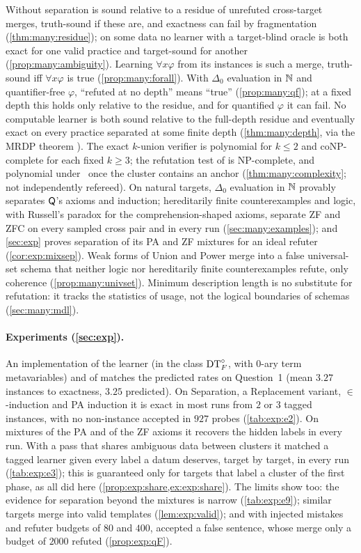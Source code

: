 Without separation \DTRC{} is sound relative to a residue of unrefuted cross-target merges, truth-sound if these are,
and exactness can fail by fragmentation (\cref{thm:many:residue}); on some data no learner with a target-blind oracle is
both exact for one valid practice and target-sound for another (\cref{prop:many:ambiguity}). Learning $\forall x\varphi$
from its instances is such a merge, truth-sound iff $\forall x\varphi$ is true (\cref{prop:many:forall}). With
$\Delta_0$ evaluation in $\mathbb{N}$ and quantifier-free $\varphi$, ``refuted at no depth'' means ``true''
(\cref{prop:many:qf}); at a fixed depth this holds only relative to the residue, and for quantified $\varphi$ it can
fail. No computable learner is both sound relative to the full-depth residue and eventually exact on every practice
separated at some finite depth (\cref{thm:many:depth}, via the MRDP theorem \citep{matiyasevich1993hilbert}). The exact
$k$-union verifier is polynomial for $k\le2$ and coNP-complete for each fixed $k\ge3$; the refutation test of \DTRC{} is
NP-complete, and polynomial under \Rich\ once the cluster contains an anchor (\cref{thm:many:complexity}; not
independently refereed). On natural targets, $\Delta_0$ evaluation in $\mathbb{N}$ provably separates $\mathsf{Q}$'s axioms and
induction; hereditarily finite counterexamples and logic, with Russell's paradox for the comprehension-shaped axioms,
separate ZF and ZFC on every sampled cross pair and in every run (\cref{sec:many:examples}); and \cref{sec:exp} proves
separation of its PA and ZF mixtures for an ideal refuter (\cref{cor:exp:mixsep}). Weak forms of Union and Power merge
into a false universal-set schema that neither logic nor hereditarily finite counterexamples refute, only coherence
(\cref{prop:many:univset}). Minimum
description length is no substitute for refutation: it tracks the statistics of usage, not the logical boundaries of
schemas (\cref{sec:many:mdl}).

\paragraph{Experiments (\cref{sec:exp}).}
An implementation of the learner (in the class $\mathrm{DT}^{\circ}_{F}$, with $0$-ary term metavariables) and of \DTRC{} matches the
predicted rates on Question~1 (mean $3.27$ instances to exactness, $3.25$ predicted). On Separation, a Replacement
variant, $\in$-induction and PA induction it is exact in most runs from $2$ or $3$ tagged instances, with no
non-instance accepted in $927$ probes (\cref{tab:exp:e2}). On mixtures of the PA and of the ZF axioms it recovers the
hidden labels in every run. With a pass that shares ambiguous data between clusters it matched a tagged learner given
every label a datum deserves, target by target, in every run (\cref{tab:exp:e3}); this is guaranteed only for targets
that label a cluster of the first phase, as all did here (\cref{prop:exp:share,ex:exp:share}). The limits show too: the
evidence for separation beyond the mixtures is narrow (\cref{tab:exp:e9}); similar targets merge into valid templates
(\cref{lem:exp:valid}); and with injected mistakes and refuter budgets of $80$ and $400$, \DTRC{} accepted a false
sentence, whose merge only a budget of $2000$ refuted (\cref{prop:exp:qF}).

